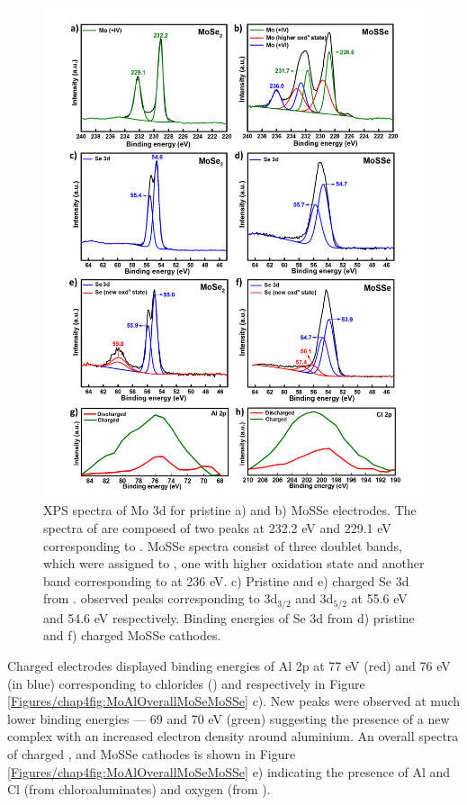 \begin{figure}
  \centering
  \includegraphics[width=\textwidth]{Figures/chap4fig/MoSeSeAlClPrtChg}
  \caption{XPS spectra of Mo 3d for pristine a)  and b) MoSSe electrodes. The spectra of  are composed of two peaks at 232.2 eV and 229.1 eV corresponding to . MoSSe spectra consist of three doublet bands, which were assigned to , one with higher oxidation state and another band corresponding to  at 236 eV. c) Pristine and e) charged Se 3d from .  observed peaks corresponding to 3d$_{3/2}$ and 3d$_{5/2}$ at 55.6 eV and 54.6 eV respectively. Binding energies of Se 3d from d) pristine and f) charged MoSSe cathodes.}
  \label{Figures/chap4fig:MoSeSeAlClPrtChg}
\end{figure}

Charged  electrodes displayed binding energies of Al 2p at 77 eV (red) and 76 eV (in blue) corresponding to chlorides () and  respectively in Figure \ref{Figures/chap4fig:MoAlOverallMoSeMoSSe} c). New peaks were observed at much lower binding energies --- 69 and 70 eV (green) suggesting the presence of a new complex with an increased electron density around aluminium. An overall spectra of charged ,  and MoSSe cathodes is shown in Figure \ref{Figures/chap4fig:MoAlOverallMoSeMoSSe} e) indicating the presence of Al and Cl (from chloroaluminates) and oxygen (from ).

